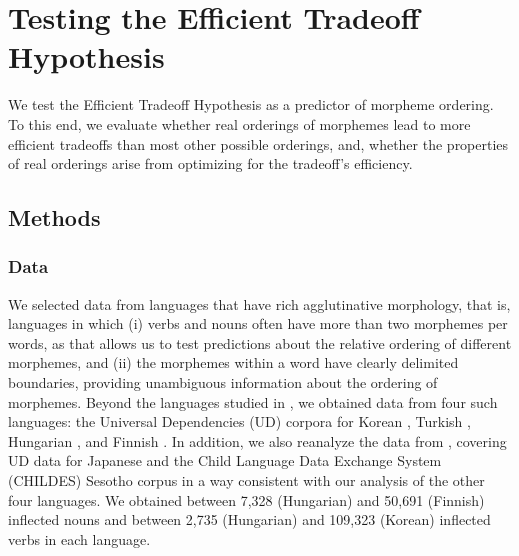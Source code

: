 \documentclass[11pt,letterpaper]{article}
\newcommand{\citep}{\parencite}
\newcommand{\citet}{\Textcite}
\newcommand{\jd}[1]{\textcolor{Pink}{[jd: #1]}}
\begin{document}
\section{Testing the Efficient Tradeoff Hypothesis}\label{seq:testing}



We test the Efficient Tradeoff Hypothesis as a predictor of morpheme ordering.
To this end, we evaluate whether real orderings of morphemes lead to more efficient tradeoffs than most other possible orderings, and, whether the properties of real orderings arise from optimizing for the tradeoff's efficiency.

\subsection{Methods} 

\subsubsection{Data} 
We selected data from languages that have rich agglutinative morphology, that is, languages in which (i) verbs and nouns often have more than two morphemes per words, as that allows us to test predictions about the relative ordering of different morphemes, and (ii) the morphemes within a word have clearly delimited boundaries, providing unambiguous information about the ordering of morphemes.
Beyond the languages studied in \citet{Hahn2020modeling}, we obtained data from four such languages: the Universal Dependencies (UD) corpora for Korean \citep{chun2018building}, Turkish \citep{turkish-imst}, Hungarian \citep{hungarian-szeged}, and Finnish \citep{UDFinnish-TDT}.
In addition, we also reanalyze the data from \citet{Hahn2020modeling}, covering UD data for Japanese \citep{asahara2018universal} and the Child Language Data Exchange System (CHILDES) Sesotho corpus \citep{demuth1992acquisition} in a way consistent with our analysis of the other four languages.
We obtained between 7,328 (Hungarian) and 50,691 (Finnish) inflected nouns and between 2,735 (Hungarian) and 109,323 (Korean) inflected verbs in each language.
\end{document}
